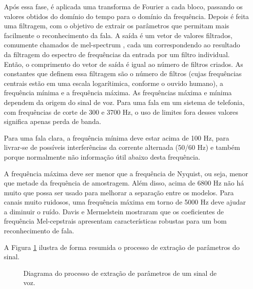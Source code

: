 \documentclass[12pt,a4paper,oneside]{report}
\begin{document}
Após essa fase, é aplicada uma transforma de Fourier a cada bloco, passando os valores obtidos do domínio do tempo para o domínio da frequência.
Depois é feita uma filtragem, com o objetivo de extrair os parâmetros que permitam mais facilmente o reconhecimento da fala. A saída é um vetor de valores filtrados, comumente chamados de mel-spectrum \cite{Cepstrum}, cada um correspondendo ao resultado da filtragem do espectro de frequências da entrada por um filtro individual. Então, o comprimento do vetor de saída é igual ao número de filtros criados.
As constantes que definem essa filtragem são o número de filtros (cujas frequências centrais estão em uma escala logarítimica, conforme o ouvido humano), a frequência mínima e a frequência máxima.
As frequências máxima e mínima dependem da origem do sinal de voz. Para uma fala em um sistema de telefonia, com frequências de corte de 300 e 3700 Hz, o uso de limites fora desses valores significa apenas perda de banda.

Para uma fala clara, a frequência mínima deve estar acima de 100 Hz, para livrar-se de possíveis interferências da corrente alternada (50/60 Hz) e também porque normalmente não informação útil abaixo desta frequência.

A frequência máxima deve ser menor que a frequência de Nyquist, ou seja, menor que metade da frequência de amostragem. Além disso, acima de 6800 Hz não há muito que possa ser usado para melhorar a separação entre os modelos. Para canais muito ruidosos, uma frequência máxima em torno de 5000 Hz deve ajudar a diminuir o ruído.
Davis e Mermelstein \cite{davis-mermelstein} mostraram que os coeficientes de frequência Mel-cepstrais apresentam características robustas para um bom reconhecimento de fala.

A Figura \ref{fig:extracao} ilustra de forma resumida o processo de extração de parâmetros do sinal.

\begin{figure}[h!]
\centering
{}\caption{Diagrama do processo de extração de parâmetros de um sinal de voz.}
\label{fig:extracao}
\end{figure}
\end{document}
